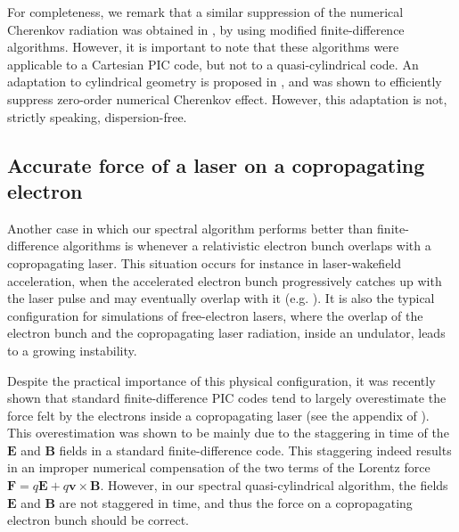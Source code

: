\documentclass[1p,times]{elsarticle}
\renewcommand{\vec}[1]{\boldsymbol{#1}}
\begin{document}
For completeness, we remark that a similar suppression of the
numerical Cherenkov radiation was 
obtained in \citep{LehePRSTAB2013,CowanPRSTAB2013}, by using 
modified finite-difference algorithms. However, it is important to
note that these algorithms were applicable to a Cartesian PIC code,
but not to a quasi-cylindrical code. An adaptation to
cylindrical geometry is proposed in \citep{LeheThesis}, and was 
shown to efficiently suppress zero-order numerical Cherenkov effect. However, this
adaptation is not, strictly speaking, dispersion-free. 

\subsection{Accurate force of a laser on a copropagating electron}
\label{sec:accurate-laser}

Another case in which our spectral algorithm performs better than
finite-difference algorithms is whenever a relativistic electron bunch
overlaps with a copropagating laser. This situation occurs for
instance in laser-wakefield acceleration, when the accelerated electron bunch
progressively catches up with the laser pulse and may eventually
overlap with it (e.g. \citep{CipicciaNatPhys2011,NemethPRL2008}). It is also the typical
configuration for simulations of free-electron lasers, where the
overlap of the electron bunch and the copropagating laser radiation, inside an
undulator, leads to a growing instability.

Despite the practical importance of this physical configuration, it
was recently shown that standard finite-difference PIC codes tend 
to largely overestimate the force felt by the electrons inside a
copropagating laser (see the appendix of \citep{LehePRSTAB2014}). This
overestimation was shown to be mainly due to the staggering in time 
of the $\vec{E}$ and $\vec{B}$ fields in a standard finite-difference
code. This staggering indeed results in an improper numerical compensation of 
the two terms of the Lorentz force $\vec{F} = q\vec{E} +
q\vec{v}\times\vec{B}$. However, in our spectral quasi-cylindrical
algorithm, the fields $\vec{E}$ and $\vec{B}$ are not staggered in
time, and thus the force on a copropagating electron bunch should be
correct.
\end{document}
